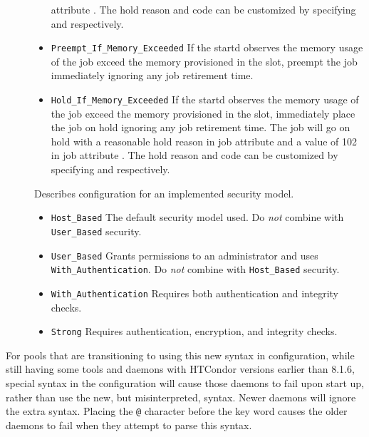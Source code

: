 \begin{description}
\begin{itemize}
	attribute .  The hold reason and code can be customized by
	specifying  and
	 respectively.
	\item \texttt{Preempt\_If\_Memory\_Exceeded}
	If the startd observes the memory usage of the job exceed
	the memory provisioned in the slot, preempt the job immediately
	ignoring any job retirement time.
	\item \texttt{Hold\_If\_Memory\_Exceeded}
	If the startd observes the memory usage of the job exceed
	the memory provisioned in the slot,
	immediately place the job on hold
	ignoring any job retirement time.
	The job will go on hold with a reasonable
	hold reason in job attribute  and a value of 102 in job
	attribute .  The hold reason and code can be customized by
	specifying  and
	 respectively.
  \end{itemize}

\label{usecategory:SECURITY}
\item[\MacroNI{SECURITY}]
  Describes configuration for an implemented security model.
  \begin{itemize}
    \item \texttt{Host\_Based}
    The default security model used.
    Do \emph{not} combine with \texttt{User\_Based} security.
    \item \texttt{User\_Based}
    Grants permissions to an administrator and uses 
    \texttt{With\_Authentication}.
    Do \emph{not} combine with \texttt{Host\_Based} security.
    \item \texttt{With\_Authentication}
    Requires both authentication and integrity checks.
    \item \texttt{Strong}
    Requires authentication, encryption, and integrity checks.
  \end{itemize}

\end{description}

For pools that are transitioning to using this new syntax in configuration,
while still having some tools and daemons with HTCondor versions 
earlier than 8.1.6,
special syntax in the configuration will cause those daemons to
fail upon start up,
rather than use the new, but misinterpreted, syntax. 
Newer daemons will ignore the extra syntax.
Placing the \verb|@| character before the  key word
causes the older daemons to fail when they attempt to
parse this syntax.

